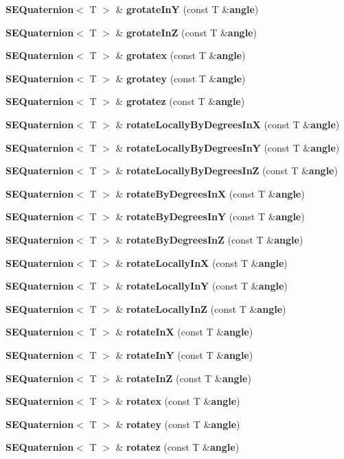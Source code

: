 \begin{DoxyCompactItemize}
{\bf S\+E\+Quaternion}$<$ T $>$ \& {\bf grotate\+In\+Y} (const T \&{\bf angle})
\item 
{\bf S\+E\+Quaternion}$<$ T $>$ \& {\bf grotate\+In\+Z} (const T \&{\bf angle})
\item 
{\bf S\+E\+Quaternion}$<$ T $>$ \& {\bf grotatex} (const T \&{\bf angle})
\item 
{\bf S\+E\+Quaternion}$<$ T $>$ \& {\bf grotatey} (const T \&{\bf angle})
\item 
{\bf S\+E\+Quaternion}$<$ T $>$ \& {\bf grotatez} (const T \&{\bf angle})
\item 
{\bf S\+E\+Quaternion}$<$ T $>$ \& {\bf rotate\+Locally\+By\+Degrees\+In\+X} (const T \&{\bf angle})
\item 
{\bf S\+E\+Quaternion}$<$ T $>$ \& {\bf rotate\+Locally\+By\+Degrees\+In\+Y} (const T \&{\bf angle})
\item 
{\bf S\+E\+Quaternion}$<$ T $>$ \& {\bf rotate\+Locally\+By\+Degrees\+In\+Z} (const T \&{\bf angle})
\item 
{\bf S\+E\+Quaternion}$<$ T $>$ \& {\bf rotate\+By\+Degrees\+In\+X} (const T \&{\bf angle})
\item 
{\bf S\+E\+Quaternion}$<$ T $>$ \& {\bf rotate\+By\+Degrees\+In\+Y} (const T \&{\bf angle})
\item 
{\bf S\+E\+Quaternion}$<$ T $>$ \& {\bf rotate\+By\+Degrees\+In\+Z} (const T \&{\bf angle})
\item 
{\bf S\+E\+Quaternion}$<$ T $>$ \& {\bf rotate\+Locally\+In\+X} (const T \&{\bf angle})
\item 
{\bf S\+E\+Quaternion}$<$ T $>$ \& {\bf rotate\+Locally\+In\+Y} (const T \&{\bf angle})
\item 
{\bf S\+E\+Quaternion}$<$ T $>$ \& {\bf rotate\+Locally\+In\+Z} (const T \&{\bf angle})
\item 
{\bf S\+E\+Quaternion}$<$ T $>$ \& {\bf rotate\+In\+X} (const T \&{\bf angle})
\item 
{\bf S\+E\+Quaternion}$<$ T $>$ \& {\bf rotate\+In\+Y} (const T \&{\bf angle})
\item 
{\bf S\+E\+Quaternion}$<$ T $>$ \& {\bf rotate\+In\+Z} (const T \&{\bf angle})
\item 
{\bf S\+E\+Quaternion}$<$ T $>$ \& {\bf rotatex} (const T \&{\bf angle})
\item 
{\bf S\+E\+Quaternion}$<$ T $>$ \& {\bf rotatey} (const T \&{\bf angle})
\item 
{\bf S\+E\+Quaternion}$<$ T $>$ \& {\bf rotatez} (const T \&{\bf angle})
\item 

\end{DoxyCompactItemize}
